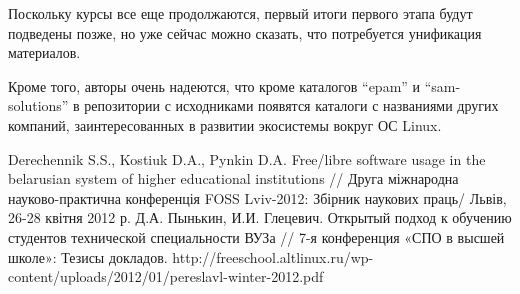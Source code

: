 \documentclass[10pt, a5paper]{article}
\begin{document}
Поскольку курсы все еще продолжаются, первый итоги первого этапа будут подведены позже, но уже сейчас можно сказать, что потребуется унификация материалов.

Кроме того, авторы очень надеются, что кроме каталогов “epam” и “sam-solutions” в репозитории с исходниками появятся каталоги с названиями других компаний, заинтересованных в развитии экосистемы вокруг ОС Linux.

\begin{thebibliography}{9}
 {Derechennik S.S., Kostiuk D.A., Pynkin D.A. Free/libre software usage in the belarusian system of higher educational institutions // Друга міжнародна науково-практична конференція FOSS Lviv-2012: Збірник наукових праць/ Львів, 26-28 квітня 2012 р.}
 {Д.А. Пынькин, И.И. Глецевич. Открытый подход к обучению студентов технической
специальности ВУЗа // 7-я конференция «СПО в высшей школе»: Тезисы докладов. http://freeschool.altlinux.ru/wp-content/uploads/2012/01/pereslavl-winter-2012.pdf}\end{thebibliography}
\end{document}
